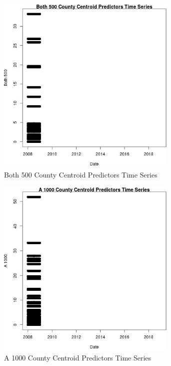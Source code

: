 \begin{figure} 
\centering  
\includegraphics[width=0.77\textwidth]{Code_Outputs/df_report_ML_predictors_CountyCentroid_Locations_Dates_2008-01-01to2018-12-31_Both_500vDate.jpg} 
\caption{\label{fig:df_report_ML_predictors_CountyCentroid_Locations_Dates_2008-01-01to2018-12-31Both_500vDate}Both 500 County Centroid Predictors Time Series} 
\end{figure} 
 

\clearpage 

\begin{figure} 
\centering  
\includegraphics[width=0.77\textwidth]{Code_Outputs/df_report_ML_predictors_CountyCentroid_Locations_Dates_2008-01-01to2018-12-31_A_1000vDate.jpg} 
\caption{\label{fig:df_report_ML_predictors_CountyCentroid_Locations_Dates_2008-01-01to2018-12-31A_1000vDate}A 1000 County Centroid Predictors Time Series} 
\end{figure} 
 

